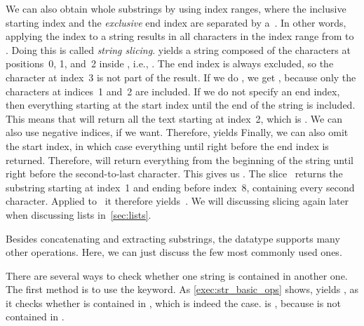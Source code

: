 We can also obtain whole substrings by using index ranges, where the inclusive starting index and the \emph{exclusive} end index are separated by a~\pythonilIdx{:}.
In other words, applying the index \pythonil{[a:b]}\pythonIdx{[i:j]} to a string results in all characters in the index range from  to .
Doing this is called \emph{string slicing}.
 yields a string composed of the characters at positions~0, 1, and~2 inside , i.e., .
The end index is always excluded, so the character at index~3 is not part of the result.
If we do , we get , because only the characters at indices~1 and~2 are included.
If we do not specify an end index, then everything starting at the start index until the end of the string is included.
This means that  will return all the text starting at index~2, which is .
We can also use negative indices, if we want.
Therefore,  yields 
Finally, we can also omit the start index, in which case everything until right before the end index is returned.
Therefore,  will return everything from the beginning of the string until right before the second-to-last character.
This gives us .
The slice~\pythonil{[1:8:2]} returns the substring starting at index~1 and ending before index~8, containing every second character.
Applied to~ it therefore yields~.
We will discussing slicing again later when discussing lists in~\cref{sec:lists}.

%
%

Besides concatenating and extracting substrings, the  datatype supports many other operations.
Here, we can just discuss the few most commonly used ones.

There are several ways to check whether one string is contained in another one.
The first method is to use the  keyword.
As \cref{exec:str_basic_ops} shows,  yields , as it checks whether  is contained in , which is indeed the case.
 is , because  is not contained in .

